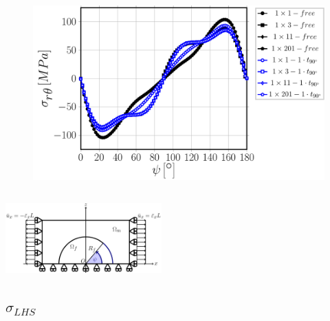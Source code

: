 \documentclass[first,firstsupp,lastsupp,last,hyperref,table]{ETHclass}
\begin{document}
\begin{frame}
\begin{columns}[c]
\begin{column}{0.5\textwidth}
\begin{figure}
\includegraphics[width=\columnwidth]{vf60-nodamage-taurt.pdf}
\end{figure}
\end{column}
\end{columns}
\vspace{-0.25cm}
\includegraphics[width=0.45\textwidth]{refAngle.pdf}
\end{frame}

\subsection{$\sigma_{LHS}$}
\end{document}
